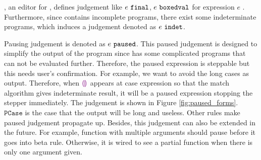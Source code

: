 \HazelnutLive, an editor for \Hazel, defines judgement like $e ~\mathtt{final}$, $e ~\mathtt{boxedval}$ for expression $e$ \cite{HazelLive}. Furthermore, since \Hazel contains incomplete programs, there exist some indeterminate programs, which induces a judgement denoted as $e ~\mathtt{indet}$.

Pausing judgement is denoted as $e ~\mathtt{paused}$. This paused judgement is designed to simplify the output of the program since \Hazel has some complicated programs that can not be evaluated further. Therefore, the paused expression is steppable but this needs user's confirmation. For example, we want to avoid the long cases as output. Therefore, when $\textcolor{violet}{\llparenthesis}\textcolor{violet}{\rrparenthesis}$ appears at case expression so that the match algorithm gives indeterminate result, it will be a paused expression stopping the stepper immediately. The judgement is shown in Figure \ref{fig:paused_forms}. $\mathtt{PCase}$ is the case that the output will be long and useless. Other rules make paused judgement propagate up. Besides, this judgement can also be extended in the future. For example, function with multiple arguments should pause before it goes into beta rule. Otherwise, it is wired to see a partial function when there is only one argument given.



